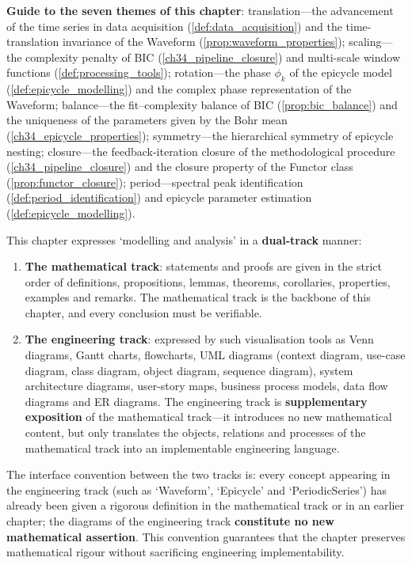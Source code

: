 \begin{remark}
\textbf{Guide to the seven themes of this chapter}: translation---the advancement of the time series in data acquisition (\cref{def:data_acquisition}) and the time-translation invariance of the Waveform (\cref{prop:waveform_properties}); scaling---the complexity penalty of BIC (\cref{ch34_pipeline_closure}) and multi-scale window functions (\cref{def:processing_tools}); rotation---the phase $\phi_k$ of the epicycle model (\cref{def:epicycle_modelling}) and the complex phase representation of the Waveform; balance---the fit--complexity balance of BIC (\cref{prop:bic_balance}) and the uniqueness of the parameters given by the Bohr mean (\cref{ch34_epicycle_properties}); symmetry---the hierarchical symmetry of epicycle nesting; closure---the feedback-iteration closure of the methodological procedure (\cref{ch34_pipeline_closure}) and the closure property of the Functor class (\cref{prop:functor_closure}); period---spectral peak identification (\cref{def:period_identification}) and epicycle parameter estimation (\cref{def:epicycle_modelling}).
\end{remark}

\begin{remark}\label{rem:modelling_dual_track}
This chapter expresses `modelling and analysis' in a \textbf{dual-track} manner:
\begin{enumerate}[label=(\roman*)]
    \item \textbf{The mathematical track}: statements and proofs are given in the strict order of definitions, propositions, lemmas, theorems, corollaries, properties, examples and remarks. The mathematical track is the backbone of this chapter, and every conclusion must be verifiable.
    \item \textbf{The engineering track}: expressed by such visualisation tools as Venn diagrams, Gantt charts, flowcharts, UML diagrams (context diagram, use-case diagram, class diagram, object diagram, sequence diagram), system architecture diagrams, user-story maps, business process models, data flow diagrams and ER diagrams. The engineering track is \textbf{supplementary exposition} of the mathematical track---it introduces no new mathematical content, but only translates the objects, relations and processes of the mathematical track into an implementable engineering language.
\end{enumerate}
The interface convention between the two tracks is: every concept appearing in the engineering track (such as `Waveform', `Epicycle' and `PeriodicSeries') has already been given a rigorous definition in the mathematical track or in an earlier chapter; the diagrams of the engineering track \textbf{constitute no new mathematical assertion}. This convention guarantees that the chapter preserves mathematical rigour without sacrificing engineering implementability.
\end{remark}

